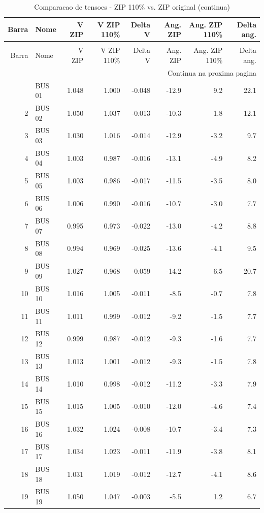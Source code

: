 \documentclass[12pt]{classe_uftex/uftex}
\begin{document}
\scriptsize
\begin{longtable}{rlrrrrrr}
\caption{Comparacao de tensoes - ZIP 110\% vs. ZIP original}\label{tab:tensoes-zip110-zip}\\
\toprule
Barra & Nome & V ZIP & V ZIP 110\% & Delta V & Ang. ZIP & Ang. ZIP 110\% & Delta ang. \\
\midrule
\endfirsthead
\caption[]{Comparacao de tensoes - ZIP 110\% vs. ZIP original (continua)}\\
\toprule
Barra & Nome & V ZIP & V ZIP 110\% & Delta V & Ang. ZIP & Ang. ZIP 110\% & Delta ang. \\
\midrule
\endhead
\midrule
\multicolumn{8}{r}{Continua na proxima pagina}\\
\endfoot
\bottomrule
\endlastfoot
1 & BUS 01 & 1.048 & 1.000 & -0.048 & -12.9 & 9.2 & 22.1 \\
2 & BUS 02 & 1.050 & 1.037 & -0.013 & -10.3 & 1.8 & 12.1 \\
3 & BUS 03 & 1.030 & 1.016 & -0.014 & -12.9 & -3.2 & 9.7 \\
4 & BUS 04 & 1.003 & 0.987 & -0.016 & -13.1 & -4.9 & 8.2 \\
5 & BUS 05 & 1.003 & 0.986 & -0.017 & -11.5 & -3.5 & 8.0 \\
6 & BUS 06 & 1.006 & 0.990 & -0.016 & -10.7 & -3.0 & 7.7 \\
7 & BUS 07 & 0.995 & 0.973 & -0.022 & -13.0 & -4.2 & 8.8 \\
8 & BUS 08 & 0.994 & 0.969 & -0.025 & -13.6 & -4.1 & 9.5 \\
9 & BUS 09 & 1.027 & 0.968 & -0.059 & -14.2 & 6.5 & 20.7 \\
10 & BUS 10 & 1.016 & 1.005 & -0.011 & -8.5 & -0.7 & 7.8 \\
11 & BUS 11 & 1.011 & 0.999 & -0.012 & -9.2 & -1.5 & 7.7 \\
12 & BUS 12 & 0.999 & 0.987 & -0.012 & -9.3 & -1.6 & 7.7 \\
13 & BUS 13 & 1.013 & 1.001 & -0.012 & -9.3 & -1.5 & 7.8 \\
14 & BUS 14 & 1.010 & 0.998 & -0.012 & -11.2 & -3.3 & 7.9 \\
15 & BUS 15 & 1.015 & 1.005 & -0.010 & -12.0 & -4.6 & 7.4 \\
16 & BUS 16 & 1.032 & 1.024 & -0.008 & -10.7 & -3.4 & 7.3 \\
17 & BUS 17 & 1.034 & 1.023 & -0.011 & -11.9 & -3.8 & 8.1 \\
18 & BUS 18 & 1.031 & 1.019 & -0.012 & -12.7 & -4.1 & 8.6 \\
19 & BUS 19 & 1.050 & 1.047 & -0.003 & -5.5 & 1.2 & 6.7 \\

\end{longtable}
\end{document}
